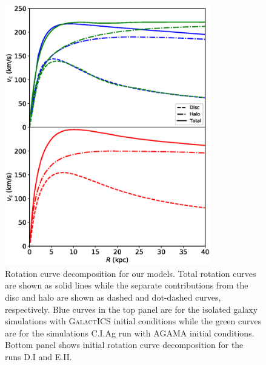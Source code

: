 \begin{figure}
	\centering
	\includegraphics[width=0.8\textwidth]{../figures/rotation_curves_two_panel.eps}
	\caption{Rotation curve decomposition for our models. Total
          rotation curves are shown as solid lines while the separate
          contributions from the disc and halo are shown as dashed and
          dot-dashed curves, respectively.  Blue curves in the top
          panel are for the isolated galaxy simulations with
          \textsc{GalactICS} initial conditions while the green curves
          are for the simulations C.I.Ag run with \textsc{AGAMA}
          initial conditions.  Bottom panel shows initial rotation
          curve decomposition for the runs D.I and
          E.II.}\label{fig:rcs}
\end{figure}


